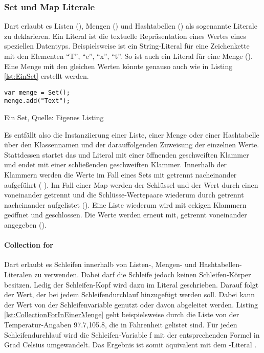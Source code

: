 \subsubsection{Set und Map Literale}

Dart erlaubt es Listen (), Mengen () und Hashtabellen () als sogenannte Literale zu deklarieren. Ein Literal ist die textuelle Repräsentation eines Wertes eines speziellen Datentyps. Beispielsweise ist   ein String-Literal für eine Zeichenkette mit den Elementen \enquote{T}, \enquote{e}, \enquote{x}, \enquote{t}. So ist auch   ein Literal für eine Menge (). Eine Menge mit den gleichen Werten könnte genauso auch wie in Listing \ref{lst:EinSet} erstellt werden.

\ifincludeall
  \begin{listing}[ht]
    \begin{verbatim}
var menge = Set();
menge.add("Text");
\end{verbatim}
    \caption[Ein Set]{Ein Set, Quelle: Eigenes Listing}
    \label{lst:EinSet}
  \end{listing}
\fi

Es entfällt also die Instanziierung einer Liste, einer Menge oder einer Hashtabelle über den Klassennamen und der darauffolgenden Zuweisung der einzelnen Werte. Stattdessen startet das  und  Literal mit einer öffnenden geschweiften Klammer und endet mit einer schließenden geschweiften Klammer. Innerhalb der Klammern werden die Werte im Fall eines Sets mit \IC{,} getrennt nacheinander aufgeführt (  ). Im Fall einer Map werden der Schlüssel und der Wert durch einen \IC{:} voneinander getrennt und die Schlüsse-Wertepaare wiederum durch \IC{,} getrennt nacheinander aufgelistet (). Eine Liste wiederum wird mit eckigen Klammern geöffnet und geschlossen. Die Werte werden erneut mit, getrennt voneinander angegeben (\IC{[1,2]}).

\paragraph{Collection for} Dart erlaubt es Schleifen innerhalb von Listen-, Mengen- und Hashtabellen-Literalen zu verwenden. Dabei darf die Schleife jedoch keinen Schleifen-Körper besitzen. Ledig der Schleifen-Kopf wird dazu im Literal geschrieben. Darauf folgt der Wert, der bei jedem Schleifendurchlauf hinzugefügt werden soll. Dabei kann der Wert von der Schleifenvariable genutzt oder davon abgeleitet werden.
Listing \ref{lst:CollectionForInEinerMenge} geht beispielsweise durch die Liste von der Temperatur-Angaben 97.7,105.8, die in Fahrenheit gelistet sind. Für jeden Schleifendurchlauf wird die Schleifen-Variable f mit der entsprechenden Formel in Grad Celsius umgewandelt. Das Ergebnis ist somit äquivalent mit dem -Literal .


